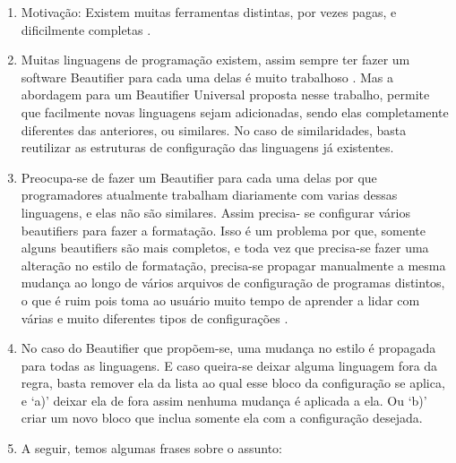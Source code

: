     \begin{enumerate}[leftmargin=*]

        \item

        Motivação: Existem muitas ferramentas distintas, por vezes pagas, e dificilmente completas
        \cite{Terence}.

        \item

        Muitas linguagens de programação existem, assim sempre ter fazer um software Beautifier para
        cada uma delas é muito trabalhoso \cite{Terence}. Mas a abordagem para um Beautifier
        Universal proposta nesse trabalho, permite que facilmente novas linguagens sejam
        adicionadas, sendo elas completamente diferentes das anteriores, ou similares. No caso de
        similaridades, basta reutilizar as estruturas de configuração das linguagens já existentes.

        \item

        Preocupa-se de fazer um Beautifier para cada uma delas por que programadores atualmente
        trabalham diariamente com varias dessas linguagens, e elas não são similares. Assim precisa-
        se configurar vários beautifiers para fazer a formatação. Isso é um problema por que,
        somente alguns beautifiers são mais completos, e toda vez que precisa-se fazer uma alteração
        no estilo de formatação, precisa-se propagar manualmente a mesma mudança ao longo de vários
        arquivos de configuração de programas distintos, o que é ruim pois toma ao usuário muito
        tempo de aprender a lidar com várias e muito diferentes tipos de configurações
        \cite{Schweitzer}.

        \item

        No caso do Beautifier que propõem-se, uma mudança no estilo é propagada para todas as
        linguagens. E caso queira-se deixar alguma linguagem fora da regra, basta remover ela da
        lista ao qual esse bloco da configuração se aplica, e `a)' deixar ela de fora assim nenhuma
        mudança é aplicada a ela. Ou `b)' criar um novo bloco que inclua somente ela com a
        configuração desejada.

        \item

        A seguir, temos algumas frases sobre o assunto:


\end{enumerate}
